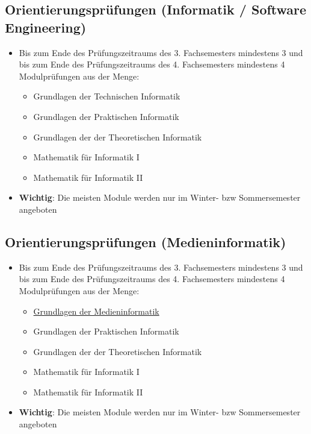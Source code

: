 \documentclass[
	aspectratio=169, 
	10pt 
]{beamer}
\begin{document}
\subsection{Orientierungsprüfungen (Informatik / Software Engineering)}
\begin{frame}{\insertsubsection \footnotemark[1]}
    \begin{itemize}
        \item Bis zum Ende des Prüfungszeitraums des 3. Fachsemesters mindestens 3 und bis zum Ende des Prüfungszeitraums des 4. Fachsemesters mindestens 4 Modulprüfungen aus der Menge: \begin{itemize}
        \item Grundlagen der Technischen Informatik
        \item Grundlagen der Praktischen Informatik
        \item Grundlagen der der Theoretischen Informatik
        \item Mathematik für Informatik I
        \item Mathematik für Informatik II \end{itemize}
        \item \textbf{Wichtig}: Die meisten Module werden nur im Winter- bzw Sommersemester angeboten
    \end{itemize}

\end{frame}

\subsection{Orientierungsprüfungen (Medieninformatik)}
\begin{frame}{\insertsubsection \footnotemark[1]}
    \begin{itemize}
        \item Bis zum Ende des Prüfungszeitraums des 3. Fachsemesters mindestens 3 und bis zum Ende des Prüfungszeitraums des 4. Fachsemesters mindestens 4 Modulprüfungen aus der Menge: \begin{itemize}
        \item \underline{Grundlagen der Medieninformatik}
        \item Grundlagen der Praktischen Informatik
        \item Grundlagen der der Theoretischen Informatik
        \item Mathematik für Informatik I
        \item Mathematik für Informatik II \end{itemize}
        \item \textbf{Wichtig}: Die meisten Module werden nur im Winter- bzw Sommersemester angeboten
    \end{itemize}

\end{frame}
\end{document}
